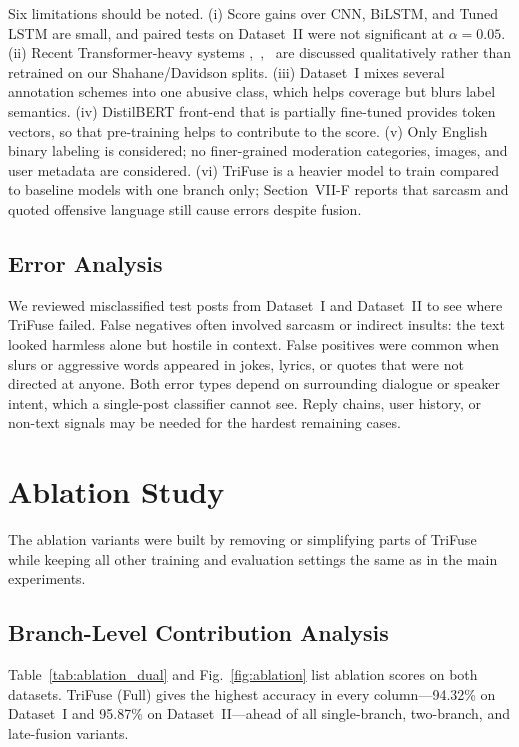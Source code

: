 Six limitations should be noted. (i) Score gains over CNN, BiLSTM, and Tuned LSTM are small, and paired tests on Dataset~II were not significant at $\alpha=0.05$. (ii) Recent Transformer-heavy systems \cite{ref14},~\cite{ref15},~\cite{ref16} are discussed qualitatively rather than retrained on our Shahane/Davidson splits. (iii) Dataset~I mixes several annotation schemes into one abusive class, which helps coverage but blurs label semantics. (iv) DistilBERT front-end that is partially fine-tuned provides token
vectors, so that pre-training helps to contribute to the score.
(v) Only English binary labeling is considered; no finer-grained
moderation categories, images, and user metadata are considered.
(vi) TriFuse is a heavier model to train compared to baseline models
with one branch only; Section~VII-F reports that sarcasm and quoted offensive language still cause errors despite fusion.

\subsection{Error Analysis}

We reviewed misclassified test posts from Dataset~I and Dataset~II to see where TriFuse failed. False negatives often involved sarcasm or indirect insults: the text looked harmless alone but hostile in context. False positives were common when slurs or aggressive words appeared in jokes, lyrics, or quotes that were not directed at anyone. Both error types depend on surrounding dialogue or speaker intent, which a single-post classifier cannot see. Reply chains, user history, or non-text signals may be needed for the hardest remaining cases.

\section{Ablation Study}

The ablation variants were built by removing or simplifying parts of TriFuse while keeping all other training and evaluation settings the same as in the main experiments.

\subsection{Branch-Level Contribution Analysis}

Table~\ref{tab:ablation_dual} and Fig.~\ref{fig:ablation} list ablation scores on both datasets. TriFuse (Full) gives the highest accuracy in every column---94.32\% on Dataset~I and 95.87\% on Dataset~II---ahead of all single-branch, two-branch, and late-fusion variants.

